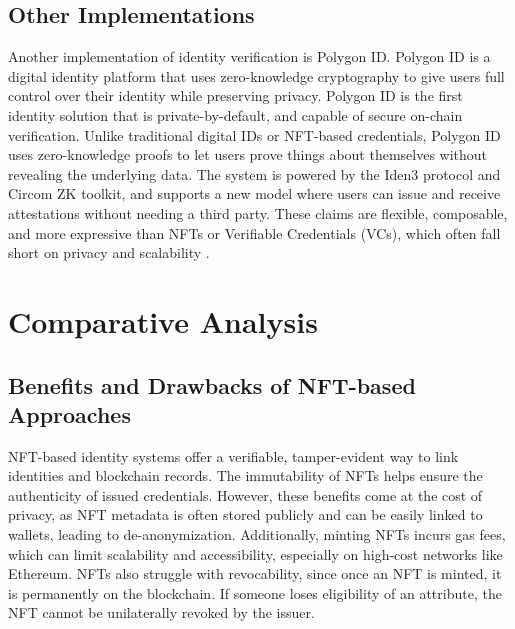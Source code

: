 \documentclass[conference]{IEEEtran}
\begin{document}
\subsection{Other Implementations}
Another implementation of identity verification is Polygon ID. Polygon ID is a digital identity platform that uses zero-knowledge cryptography to give users full control over their identity while preserving privacy. Polygon ID is the first identity solution that is private-by-default, and capable of secure on-chain verification. Unlike traditional digital IDs or NFT-based credentials, Polygon ID uses zero-knowledge proofs to let users prove things about themselves without revealing the underlying data. The system is powered by the Iden3 protocol and Circom ZK toolkit, and supports a new model where users can issue and receive attestations without needing a third party. These claims are flexible, composable, and more expressive than NFTs or Verifiable Credentials (VCs), which often fall short on privacy and scalability \cite{polygon}.

\section{Comparative Analysis}

\subsection{Benefits and Drawbacks of NFT-based Approaches}
NFT-based identity systems offer a verifiable, tamper-evident way to link identities and blockchain records. The immutability of NFTs helps ensure the authenticity of issued credentials. However, these benefits come at the cost of privacy, as NFT metadata is often stored publicly and can be easily linked to wallets, leading to de-anonymization. Additionally, minting NFTs incurs gas fees, which can limit scalability and accessibility, especially on high-cost networks like Ethereum. NFTs also struggle with revocability, since once an NFT is minted, it is permanently on the blockchain. If someone loses eligibility of an attribute, the NFT cannot be unilaterally revoked by the issuer.
\end{document}
